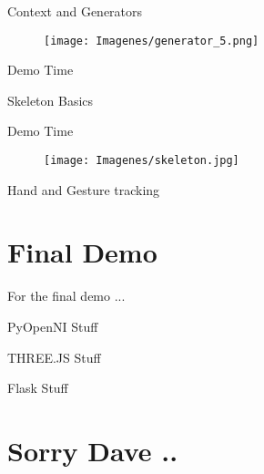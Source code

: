 \documentclass[bigger]{beamer}
\begin{document}
\begin{frame}{\ECFAugie Context and Generators}
\begin{figure}[h]
		\texttt{[image: Imagenes/generator\_5.png]}
\end{figure}
\end{frame}

\begin{frame}[fragile]{\ECFAugie Demo Time}
\begin{center}
\end{center}
\end{frame}

\begin{frame}{\ECFAugie Skeleton Basics}
\end{frame}

\begin{frame}{\ECFAugie Demo Time}
\begin{figure}[h]
		\texttt{[image: Imagenes/skeleton.jpg]}
\end{figure}
\end{frame}

\begin{frame}{\ECFAugie Hand and Gesture tracking}
\end{frame}


\section{Final Demo}
\begin{frame}{\ECFAugie For the final demo ...}
\end{frame}

\begin{frame}{\ECFAugie PyOpenNI Stuff}
\end{frame}


\begin{frame}{\ECFAugie THREE.JS Stuff}
\end{frame}


\begin{frame}{\ECFAugie Flask Stuff}
\end{frame}

\section{Sorry Dave ..}
\end{document}
